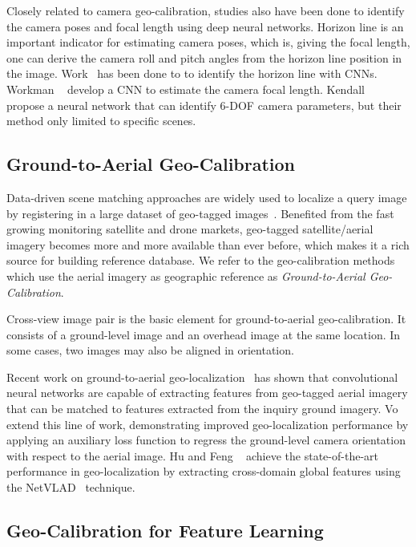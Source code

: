 Closely related to camera geo-calibration, studies also have been done
to identify the camera poses and focal length using deep neural
networks.
Horizon line is an important indicator for estimating camera poses,
which is, giving the focal length, one can derive the camera roll and
pitch angles from the horizon line position in the image.
Work~\cite{zhai2016horizon, workman2016horizon, hold2017perceptual}
has been done to to identify the horizon line with CNNs.  Workman
\etal~\cite{workman2015deepfocal} develop a CNN to estimate the camera
focal length. Kendall \etal~\cite{kendall2015convolutional} propose a
neural network that can identify 6-DOF camera parameters, but their
method only limited to specific scenes.


\subsection{Ground-to-Aerial Geo-Calibration}
Data-driven scene matching approaches are widely used to localize a
query image by registering in a large dataset of geo-tagged
images~\cite{im2gps, li2010location,zamir2010accurate}.
Benefited from the fast growing monitoring satellite and drone markets,
geo-tagged satellite/aerial imagery becomes more and more available
than ever before, which makes it a rich source for building
reference database. We refer to the geo-calibration methods which use
the aerial imagery as geographic reference as {\em Ground-to-Aerial
Geo-Calibration}.

Cross-view image pair is the basic element for ground-to-aerial
geo-calibration. It consists of a ground-level image and an overhead
image at the same location. In some cases, two images may also be aligned
in orientation. 

Recent work on ground-to-aerial
geo-localization~\cite{lin2013cross,lin2015learning,workman2015geocnn,workman2015wide}
has shown that convolutional neural networks are capable of extracting
features from geo-tagged aerial imagery that can be matched to features extracted
from the inquiry ground imagery.  Vo \etal~\cite{vo2016localizing} extend this
line of work, demonstrating improved geo-localization performance by
applying an auxiliary loss function to regress the ground-level camera
orientation with respect to the aerial image. Hu and Feng
\etal~\cite{mh2018cvm} achieve the state-of-the-art performance in
geo-localization by extracting cross-domain global features using
the NetVLAD~\cite{arandjelovic2016netvlad} technique.


\subsection{Geo-Calibration for Feature Learning}

